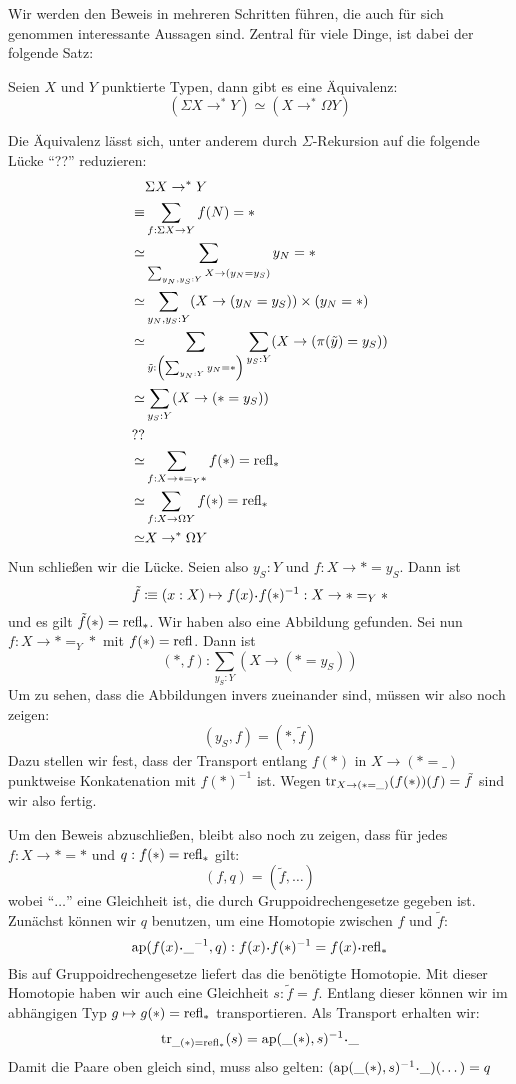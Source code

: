 Wir werden den Beweis in mehreren Schritten führen, die auch für sich genommen interessante Aussagen sind.
Zentral für viele Dinge, ist dabei der folgende Satz:
\begin{theorem}
  \label{thm:adjunktion-schleifenraum}
  Seien $X$ und $Y$ punktierte Typen, dann gibt es eine Äquivalenz:
  \[
    (\Sigma X \to^\ast Y) \simeq (X \to^\ast \Omega Y)
  \]
\end{theorem}
\begin{beweis}
  Die Äquivalenz lässt sich, unter anderem durch $\Sigma$-Rekursion auf die folgende Lücke ``??'' reduzieren:
  \begin{align*}
    &\Sigma X \to^\ast Y \\
    \equiv& \sum_{f:\Sigma X\to Y}f(N) = \ast \\
    \simeq & \sum_{\sum_{y_N,y_S:Y}X\to (y_N=y_S)} y_N=\ast \\
    \simeq & \sum_{y_N,y_S:Y}(X\to (y_N=y_S))\times (y_N=\ast) \\
    \simeq & \sum_{\tilde{y}:\left(\sum_{y_N:Y}y_N=\ast\right)}\sum_{y_S:Y}(X\to (\pi(\tilde{y})=y_S)) \\
    \simeq & \sum_{y_S:Y}(X\to (\ast=y_S)) \\
    ?? &  \\
    \simeq & \sum_{f:X\to \ast=_Y \ast}f(\ast)=\mathrm{refl}_\ast \\
    \simeq & \sum_{f:X\to \Omega Y}f(\ast)=\mathrm{refl}_\ast \\
    \simeq & X\to^\ast \Omega Y
  \end{align*}
  Nun schließen wir die Lücke. Seien also $y_S:Y$ und $f:X\to \ast=y_S$.
  Dann ist
  \[
    \tilde{f}\colonequiv (x:X)\mapsto f(x) \kon f(\ast)^{-1} : X\to \ast=_Y \ast
  \]
  und es gilt $\tilde{f}(\ast)=\mathrm{refl}_\ast$. Wir haben also eine Abbildung gefunden.
  Sei nun $f:X\to \ast=_Y \ast$ mit $f(\ast)=\mathrm{refl}$. Dann ist
  \[
    (\ast,f): \sum_{y_S:Y}(X\to (\ast=y_S))
  \]
  Um zu sehen, dass die Abbildungen invers zueinander sind, müssen wir also noch zeigen:
  \[
    (y_S,f)=(\ast,\tilde{f})
  \]
  Dazu stellen wir fest, dass der Transport entlang $f(\ast)$ in $X\to(\ast=\_)$ punktweise Konkatenation mit $f(\ast)^{-1}$ ist.
  Wegen $\mathrm{tr}_{X\to(\ast=\_)}(f(\ast))(f)=\tilde{f}$ sind wir also fertig.

  Um den Beweis abzuschließen, bleibt also noch zu zeigen, dass für jedes $f:X\to\ast=\ast$ und $q:f(\ast)=\mathrm{refl}_\ast$ gilt:
  \[
    (f,q)=(\tilde{f},\dots)
  \]
  wobei ``$\dots$'' eine Gleichheit ist, die durch Gruppoidrechengesetze gegeben ist.
  Zunächst können wir $q$ benutzen, um eine Homotopie zwischen $f$ und $\tilde{f}$:
  \[
    \mathrm{ap}(f(x)\kon \_^{-1}, q) : f(x)\kon f(\ast)^{-1}=f(x)\kon \refl_\ast
  \]
  Bis auf Gruppoidrechengesetze liefert das die benötigte Homotopie.
  Mit dieser Homotopie haben wir auch eine Gleichheit $s:\tilde{f}=f$.
  Entlang dieser können wir im abhängigen Typ $g\mapsto g(\ast)=\mathrm{refl}_\ast$ transportieren.
  Als Transport erhalten wir:
  \[
    \transp_{\_(\ast)=\refl_\ast}(s)=\mathrm{ap}(\_(\ast),s)^{-1}\kon\_
  \]
  Damit die Paare oben gleich sind, muss also gelten: $(\mathrm{ap}(\_(\ast),s)^{-1}\kon\_)(\dots)=q$


\end{beweis}

